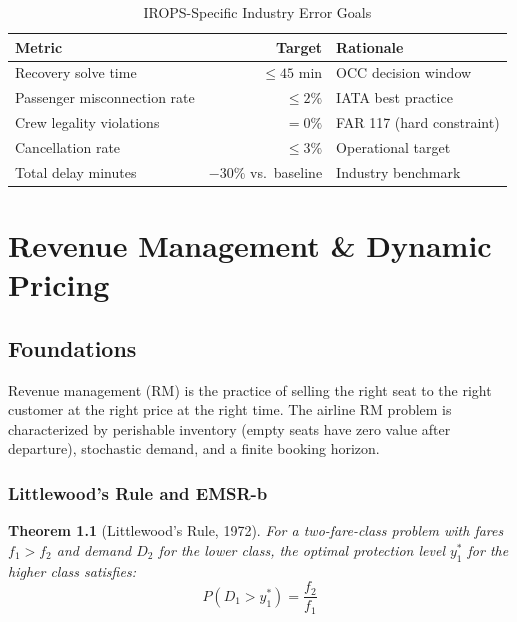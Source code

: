 \documentclass[11pt,a4paper]{book}
\newtheorem{theorem}{Theorem}[chapter]
\theoremstyle{definition}
\begin{document}
\begin{table}[h]
\centering
\caption{IROPS-Specific Industry Error Goals}
\label{tab:irops-goals}
\begin{tabular}{lrl}
\toprule
\textbf{Metric} & \textbf{Target} & \textbf{Rationale} \\
\midrule
Recovery solve time & $\leq 45$ min & OCC decision window \\
Passenger misconnection rate & $\leq 2\%$ & IATA best practice \\
Crew legality violations & $= 0\%$ & FAR 117 (hard constraint) \\
Cancellation rate & $\leq 3\%$ & Operational target \\
Total delay minutes & $-30\%$ vs.\ baseline & Industry benchmark \\
\bottomrule
\end{tabular}
\end{table}


\chapter{Revenue Management \& Dynamic Pricing}

\section{Foundations}

Revenue management (RM) is the practice of selling the right seat to the
right customer at the right price at the right time. The airline RM problem
is characterized by perishable inventory (empty seats have zero value after
departure), stochastic demand, and a finite booking horizon.

\subsection{Littlewood's Rule and EMSR-b}

\begin{theorem}[Littlewood's Rule, 1972]
For a two-fare-class problem with fares $f_1 > f_2$ and demand $D_2$ for
the lower class, the optimal protection level $y_1^*$ for the higher class
satisfies:
\begin{equation}
  P(D_1 > y_1^*) = \frac{f_2}{f_1}
\end{equation}
\end{theorem}
\end{document}
